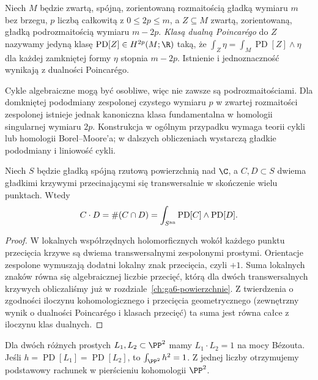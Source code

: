 \begin{definicja}
Niech $M$ będzie zwartą, spójną, zorientowaną rozmaitością
gładką wymiaru $m$ bez brzegu, $p$ liczbą całkowitą
z $0\le2p\le m$, a $Z\subseteq M$ zwartą, zorientowaną,
gładką podrozmaitością wymiaru $m-2p$.
\emph{Klasą dualną Poincarégo} do $Z$ nazywamy
jedyną klasę $\operatorname{PD}[Z]\in H^{2p}(M;\R)$ taką, że
$\int_Z\eta=\int_M\operatorname{PD}[Z]\wedge\eta$
dla każdej zamkniętej formy $\eta$ stopnia $m-2p$.
Istnienie i jednoznaczność wynikają z dualności Poincarégo.
\end{definicja}

\begin{uwaga}
Cykle algebraiczne mogą być osobliwe, więc nie zawsze są
podrozmaitościami. Dla domkniętej pododmiany zespolonej czystego wymiaru
$p$ w zwartej rozmaitości zespolonej istnieje jednak
kanoniczna klasa fundamentalna w homologii singularnej
wymiaru $2p$. Konstrukcja w ogólnym przypadku
wymaga teorii cykli lub homologii Borel–Moore'a; w dalszych
obliczeniach wystarczą gładkie pododmiany i liniowość cykli.
\end{uwaga}

\begin{stwierdzenie}
\label{st:ga10-intersection}
Niech $S$ będzie gładką spójną rzutową powierzchnią nad $\C$,
a $C,D\subset S$ dwiema gładkimi krzywymi przecinającymi się
transwersalnie w skończenie wielu punktach. Wtedy
\[
 C\cdot D=\#(C\cap D)
 =\int_{S^{\rm an}}\operatorname{PD}[C]\wedge\operatorname{PD}[D].
\]
\end{stwierdzenie}
\begin{proof}
W lokalnych współrzędnych holomorficznych wokół każdego
punktu przecięcia krzywe są dwiema transwersalnymi
zespolonymi prostymi. Orientacje zespolone wymuszają dodatni
lokalny znak przecięcia, czyli $+1$. Suma lokalnych znaków
równa się algebraicznej liczbie przecięć, którą dla dwóch
transwersalnych krzywych obliczaliśmy już w
rozdziale~\ref{ch:ga6-powierzchnie}. Z twierdzenia o zgodności
iloczynu kohomologicznego i przecięcia geometrycznego
(zewnętrzny wynik o dualności Poincarégo i klasach przecięć) ta suma jest
równa całce z iloczynu klas dualnych.
\end{proof}

\begin{przyklad}
Dla dwóch różnych prostych $L_1,L_2\subset\PP^2$ mamy
$L_1\cdot L_2=1$ na mocy Bézouta. Jeśli
$h=\operatorname{PD}[L_1]=\operatorname{PD}[L_2]$,
to $\int_{\PP^2}h^2=1$. Z jednej liczby otrzymujemy
podstawowy rachunek w pierścieniu kohomologii $\PP^2$.
\end{przyklad}

